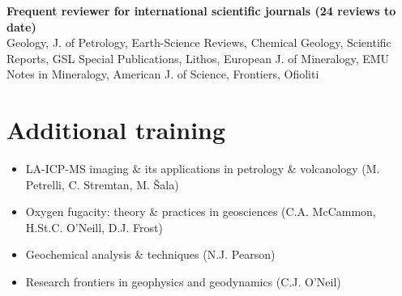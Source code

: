 \documentclass[a4paper,11pt]{article}
\begin{document}
    \textbf{Frequent reviewer for international scientific journals (24 reviews to date)}\\
      Geology, J. of Petrology, Earth-Science Reviews, Chemical Geology, Scientific Reports, GSL Special Publications, Lithos, European J. of Mineralogy, EMU Notes in Mineralogy, American J. of Science, Frontiers, Ofioliti

\section{Additional training}

    \begin{itemize}[label={},itemsep=0pt,parsep=0pt]
        \item LA-ICP-MS imaging \& its applications in petrology \& volcanology (M. Petrelli, C. Stremtan, M. Šala)
        \item Oxygen fugacity: theory \& practices in geosciences (C.A. McCammon, H.St.C. O’Neill, D.J. Frost)
        \item Geochemical analysis \& techniques (N.J. Pearson)
        \item Research frontiers in geophysics and geodynamics (C.J. O’Neil)
    \end{itemize}
    
%    
%

\end{document}
